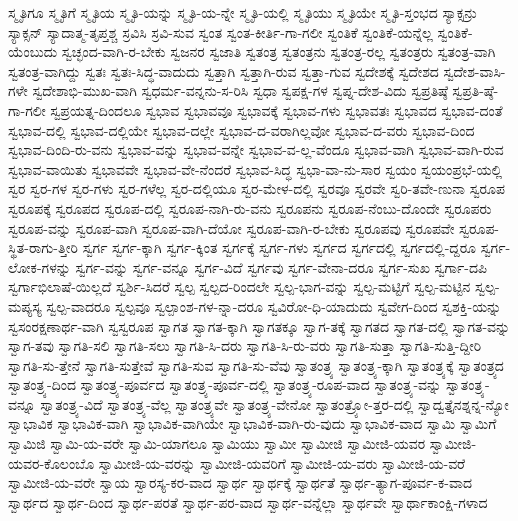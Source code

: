 {ಸ್ಮೃತಿಗೂ
ಸ್ಮೃತಿಗೆ
ಸ್ಮೃತಿಯ
ಸ್ಮೃತಿ-ಯನ್ನು
ಸ್ಮೃತಿ-ಯ-ನ್ನೇ
ಸ್ಮೃತಿ-ಯಲ್ಲಿ
ಸ್ಮೃತಿಯು
ಸ್ಮೃತಿಯೇ
ಸ್ಮೃತಿ-ಸ್ತಂಭದ
ಸ್ಯಾಕ್ಸನ್ರು
ಸ್ಯಾಕ್ಸನ್
ಸ್ಯಾದಾತ್ಮ-ತೃಪ್ತಶ್ಚ
ಸ್ರವಿಸಿ
ಸ್ರವಿ-ಸುವ
ಸ್ವಂತ
ಸ್ವಂತ-ಕೀರ್ತಿ-ಗಾ-ಗಲೀ
ಸ್ವಂತಿಕೆ
ಸ್ವಂತಿಕೆ-ಯನ್ನೆಲ್ಲ
ಸ್ವಂತಿಕೆ-ಯೆಂಬುದು
ಸ್ವಚ್ಛಂದ-ವಾಗಿ-ರ-ಬೇಕು
ಸ್ವಜನರ
ಸ್ವಜಾತಿ
ಸ್ವತಂತ್ರ
ಸ್ವತಂತ್ರನು
ಸ್ವತಂತ್ರ-ರಲ್ಲ
ಸ್ವತಂತ್ರರು
ಸ್ವತಂತ್ರ-ವಾಗಿ
ಸ್ವತಂತ್ರ-ವಾಗಿದ್ದು
ಸ್ವತಃ
ಸ್ವತಃ-ಸಿದ್ಧ-ವಾದುದು
ಸ್ವತ್ತಾಗಿ
ಸ್ವತ್ತಾಗಿ-ರುವ
ಸ್ವತ್ತಾ-ಗುವ
ಸ್ವದೇಶಕ್ಕೆ
ಸ್ವದೇಶದ
ಸ್ವದೇಶ-ವಾಸಿ-ಗಳೇ
ಸ್ವದೇಶಾಭಿ-ಮುಖ-ವಾಗಿ
ಸ್ವಧರ್ಮ-ವನ್ನನು-ಸ-ರಿಸಿ
ಸ್ವಧಾ
ಸ್ವಪಕ್ಷ-ಗಳ
ಸ್ವಪ್ನ-ದೇಶ-ವಿದು
ಸ್ವಪ್ರತಿಷ್ಠೆ
ಸ್ವಪ್ರತಿ-ಷ್ಠೆ-ಗಾ-ಗಲೀ
ಸ್ವಪ್ರಯತ್ನ-ದಿಂದಲೂ
ಸ್ವಭಾವ
ಸ್ವಭಾವವೂ
ಸ್ವಭಾವಕ್ಕೆ
ಸ್ವಭಾವ-ಗಳು
ಸ್ವಭಾವತಃ
ಸ್ವಭಾವದ
ಸ್ವಭಾವ-ದಂತೆ
ಸ್ವಭಾವ-ದಲ್ಲಿ
ಸ್ವಭಾವ-ದಲ್ಲಿಯೇ
ಸ್ವಭಾವ-ದಲ್ಲೇ
ಸ್ವಭಾವ-ದ-ವರಾಗಿಲ್ಲವೋ
ಸ್ವಭಾವ-ದ-ವರು
ಸ್ವಭಾವ-ದಿಂದ
ಸ್ವಭಾವ-ದಿಂದಿ-ರು-ವನು
ಸ್ವಭಾವ-ವನ್ನು
ಸ್ವಭಾವ-ವನ್ನೇ
ಸ್ವಭಾವ-ವ-ಲ್ಲ-ವೆಂದೂ
ಸ್ವಭಾವ-ವಾಗಿ
ಸ್ವಭಾವ-ವಾಗಿ-ರುವ
ಸ್ವಭಾವ-ವಾಯಿತು
ಸ್ವಭಾವವೇ
ಸ್ವಭಾವ-ವೇ-ನೆಂದರೆ
ಸ್ವಭಾವ-ಸಿದ್ಧ
ಸ್ವಭಾ-ವಾ-ನು-ಸಾರ
ಸ್ವಯಂ
ಸ್ವಯಂಪ್ರಭೆ-ಯಲ್ಲಿ
ಸ್ವರ
ಸ್ವರ-ಗಳ
ಸ್ವರ-ಗಳು
ಸ್ವರ-ಗಳೆಲ್ಲ
ಸ್ವರ-ದಲ್ಲಿಯೂ
ಸ್ವರ-ಮೇಳ-ದಲ್ಲಿ
ಸ್ವರವೂ
ಸ್ವರವೇ
ಸ್ವರಿ-ತವೇ-ಣುನಾ
ಸ್ವರೂಪ
ಸ್ವರೂಪಕ್ಕೆ
ಸ್ವರೂಪದ
ಸ್ವರೂಪ-ದಲ್ಲಿ
ಸ್ವರೂಪ-ನಾಗಿ-ರು-ವನು
ಸ್ವರೂಪನು
ಸ್ವರೂಪ-ನೆಂಬು-ದೊಂದೇ
ಸ್ವರೂಪರು
ಸ್ವರೂಪ-ವನ್ನು
ಸ್ವರೂಪ-ವಾಗಿ
ಸ್ವರೂಪ-ವಾಗಿ-ದೆಯೋ
ಸ್ವರೂಪ-ವಾಗಿ-ರ-ಬೇಕು
ಸ್ವರೂಪವು
ಸ್ವರೂಪವೇ
ಸ್ವರೂಪ-ಸ್ಥಿತ-ರಾಗು-ತ್ತೀರಿ
ಸ್ವರ್ಗ
ಸ್ವರ್ಗ-ಕ್ಕಾಗಿ
ಸ್ವರ್ಗ-ಕ್ಕಿಂತ
ಸ್ವರ್ಗಕ್ಕೆ
ಸ್ವರ್ಗ-ಗಳು
ಸ್ವರ್ಗದ
ಸ್ವರ್ಗದಲ್ಲಿ
ಸ್ವರ್ಗದಲ್ಲಿ-ದ್ದರೂ
ಸ್ವರ್ಗ-ಲೋಕ-ಗಳನ್ನು
ಸ್ವರ್ಗ-ವನ್ನು
ಸ್ವರ್ಗ-ವನ್ನೂ
ಸ್ವರ್ಗ-ವಿದೆ
ಸ್ವರ್ಗವು
ಸ್ವರ್ಗ-ವೇನಾ-ದರೂ
ಸ್ವರ್ಗ-ಸುಖ
ಸ್ವರ್ಗಾ-ದಪಿ
ಸ್ವರ್ಗಾಭಿಲಾಷೆ-ಯಿಲ್ಲದೆ
ಸ್ವರ್ಶಿ-ಸಿದರೆ
ಸ್ವಲ್ಪ
ಸ್ವಲ್ಪದ-ರಿಂದಲೇ
ಸ್ವಲ್ಪ-ಭಾಗ-ವನ್ನು
ಸ್ವಲ್ಪ-ಮಟ್ಟಿಗೆ
ಸ್ವಲ್ಪ-ಮಟ್ಟಿನ
ಸ್ವಲ್ಪ-ಮಪ್ಯಸ್ಯ
ಸ್ವಲ್ಪ-ವಾದರೂ
ಸ್ವಲ್ಪವೂ
ಸ್ವಲ್ಪಾಂಶ-ಗಳ-ನ್ನಾ-ದರೂ
ಸ್ವವಿರೋ-ಧಿ-ಯಾದುದು
ಸ್ವವೇಗ-ದಿಂದ
ಸ್ವಶಕ್ತಿ-ಯನ್ನು
ಸ್ವಸಂರಕ್ಷಣಾರ್ಥ-ವಾಗಿ
ಸ್ವಸ್ವರೂಪ
ಸ್ವಾಗತ
ಸ್ವಾಗತ-ಕ್ಕಾಗಿ
ಸ್ವಾಗತಕ್ಕೂ
ಸ್ವಾಗ-ತಕ್ಕೆ
ಸ್ವಾಗತದ
ಸ್ವಾಗತ-ದಲ್ಲಿ
ಸ್ವಾಗತ-ವನ್ನು
ಸ್ವಾಗ-ತವು
ಸ್ವಾಗತಿ-ಸಲಿ
ಸ್ವಾಗತಿ-ಸಲು
ಸ್ವಾಗತಿ-ಸಿ-ದರು
ಸ್ವಾಗತಿ-ಸಿ-ರು-ವರು
ಸ್ವಾಗತಿ-ಸುತ್ತಾ
ಸ್ವಾಗತಿ-ಸುತ್ತಿ-ದ್ದೀರಿ
ಸ್ವಾಗತಿ-ಸು-ತ್ತೇನೆ
ಸ್ವಾಗತಿ-ಸುತ್ತೇವೆ
ಸ್ವಾಗತಿ-ಸುವ
ಸ್ವಾಗತಿ-ಸು-ವೆವು
ಸ್ವಾತಂತ್ರ್ಯ
ಸ್ವಾತಂತ್ರ್ಯ-ಕ್ಕಾಗಿ
ಸ್ವಾತಂತ್ರ್ಯಕ್ಕೆ
ಸ್ವಾತಂತ್ರ್ಯದ
ಸ್ವಾತಂತ್ರ್ಯ-ದಿಂದ
ಸ್ವಾತಂತ್ರ್ಯ-ಪೂರ್ವದ
ಸ್ವಾತಂತ್ರ್ಯ-ಪೂರ್ವ-ದಲ್ಲಿ
ಸ್ವಾತಂತ್ರ್ಯ-ರೂಪ-ವಾದ
ಸ್ವಾತಂತ್ರ್ಯ-ವನ್ನು
ಸ್ವಾತಂತ್ರ್ಯ-ವನ್ನೂ
ಸ್ವಾತಂತ್ರ್ಯ-ವಿದೆ
ಸ್ವಾತಂತ್ರ್ಯ-ವೆಲ್ಲ
ಸ್ವಾತಂತ್ರ್ಯವೇ
ಸ್ವಾತಂತ್ರ್ಯ-ವೇನೋ
ಸ್ವಾತಂತ್ರ್ಯೋ-ತ್ತರ-ದಲ್ಲಿ
ಸ್ವಾದ್ವತ್ತೈನಶ್ನನ್ನ-ನ್ಯೋ
ಸ್ವಾಭಾವಿಕ
ಸ್ವಾಭಾವಿಕ-ವಾಗಿ
ಸ್ವಾಭಾವಿಕ-ವಾಗಿಯೇ
ಸ್ವಾಭಾವಿಕ-ವಾಗಿ-ರು-ವುದು
ಸ್ವಾಭಾವಿಕ-ವಾದ
ಸ್ವಾಮಿ
ಸ್ವಾಮಿಗೆ
ಸ್ವಾಮಿಜಿ
ಸ್ವಾಮಿ-ಯ-ವರೇ
ಸ್ವಾಮಿ-ಯಾಗಲೂ
ಸ್ವಾಮಿಯು
ಸ್ವಾಮೀ
ಸ್ವಾಮೀಜಿ
ಸ್ವಾಮೀಜಿ-ಯವರ
ಸ್ವಾಮೀಜಿ-ಯವರ-ಕೊಲಂಬೊ
ಸ್ವಾಮೀಜಿ-ಯ-ವರನ್ನು
ಸ್ವಾಮೀಜಿ-ಯವರಿಗೆ
ಸ್ವಾಮೀಜಿ-ಯ-ವರು
ಸ್ವಾಮೀಜಿ-ಯ-ವರೆ
ಸ್ವಾಮೀಜಿ-ಯ-ವರೇ
ಸ್ವಾಯ
ಸ್ವಾರಸ್ಯ-ಕರ-ವಾದ
ಸ್ವಾರ್ಥ
ಸ್ವಾರ್ಥಕ್ಕೆ
ಸ್ವಾರ್ಥತೆ
ಸ್ವಾರ್ಥ-ತ್ಯಾಗ-ಪೂರ್ವ-ಕ-ವಾದ
ಸ್ವಾರ್ಥದ
ಸ್ವಾರ್ಥ-ದಿಂದ
ಸ್ವಾರ್ಥ-ಪರತೆ
ಸ್ವಾರ್ಥ-ಪರ-ವಾದ
ಸ್ವಾರ್ಥ-ವನ್ನೆಲ್ಲಾ
ಸ್ವಾರ್ಥವೇ
ಸ್ವಾರ್ಥಾಕಾಂಕ್ಷಿ-ಗಳಾದ
}
